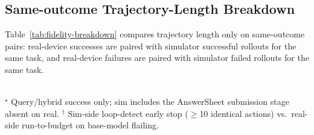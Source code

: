 \subsection{Same-outcome Trajectory-Length Breakdown}\label{app:fidelity-breakdown}

Table~\ref{tab:fidelity-breakdown} compares trajectory length only on same-outcome pairs: real-device successes are paired with simulator successful rollouts for the same task, and real-device failures are paired with simulator failed rollouts for the same task.

\begin{table}[!htbp]
  \centering\small
  \setlength{\tabcolsep}{3pt}
  \\[2pt]
  \scriptsize $^\star$ Query/hybrid success only; sim includes the AnswerSheet submission stage absent on real. $^\dagger$ Sim-side loop-detect early stop ($\geq$10 identical actions) vs.\ real-side run-to-budget on base-model flailing.
  \caption{Same-outcome paired trajectory length on sim vs.\ real, broken down by Objective and outcome. $\Delta = $ Real $-$ Sim.}
  \label{tab:fidelity-breakdown}
\end{table}

